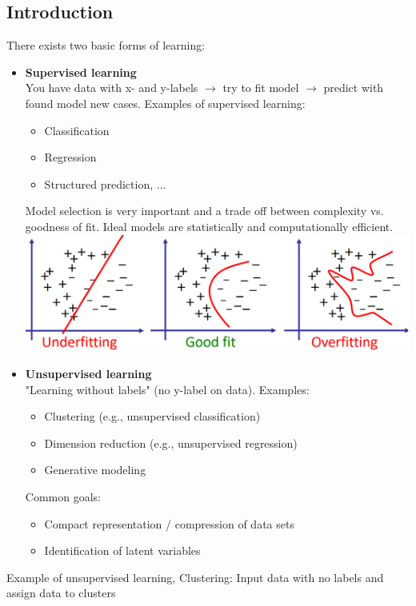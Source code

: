 \documentclass[a4paper, fontsize=8pt, landscape, DIV=1]{scrartcl}
\begin{document}
\begin{multicols*}{4}
		\section{Introduction}
		There exists two basic forms of learning:
		\begin{itemize}[noitemsep]
			\item \textbf{Supervised learning}\\
			You have data with x- and y-labels $\rightarrow$ try to fit model $\rightarrow$ predict with found model new cases. Examples of supervised learning:
			\begin{itemize}
				\item Classification
				\item Regression
				\item Structured prediction, ...
			\end{itemize}
			Model selection is very important and a trade off between complexity vs. goodness of fit. Ideal models are statistically and computationally efficient. 
			\includegraphics[width=\columnwidth]{images/Introduction/model_selection.png}
			\item \textbf{Unsupervised learning}\\
			"Learning without labels" (no y-label on data). Examples:
			\begin{itemize}[noitemsep]
				\item Clustering (e.g., unsupervised classification)
				\item Dimension reduction (e.g., unsupervised regression)
				\item Generative modeling
			\end{itemize}
			Common goals: 
			\begin{itemize}
				\item Compact representation / compression of data sets
				\item Identification of latent variables
			\end{itemize}
		\end{itemize}
		Example of unsupervised learning, Clustering: Input data with no labels and assign data to clusters

\end{multicols*}
\end{document}
